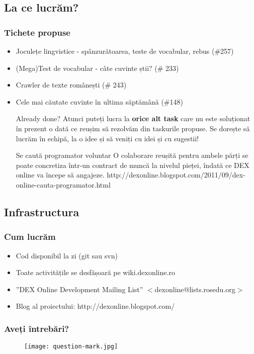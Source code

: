 \documentclass[red]{beamer}
\begin{document}
\subsection{La ce lucrăm?}
\begin{frame}

\frametitle{Tichete propuse}
\begin{itemize}
 \item Joculețe lingvistice - spânzurătoarea, teste de vocabular, rebus (\#257)
 \item (Mega)Test de vocabular - câte cuvinte știi? (\# 233)
   \item Crawler de texte românești (\# 243)
 \item Cele mai căutate cuvinte în ultima săptămână (\#148) \pause

 \begin{alertblock}{Already done?}
     Atunci puteți lucra la {\bf orice alt task} care nu este soluționat în prezent o dată ce reușim să rezolvăm din taskurile propuse. Se dorește să lucrăm
în echipă, la o idee și să veniți cu idei și cu sugestii!
 \end{alertblock} \pause
\begin{exampleblock}{Se caută programator voluntar}
O colaborare reușită pentru ambele părți se poate concretiza într-un contract de muncă la nivelul pieței, îndată ce DEX online va începe să angajeze.
http://dexonline.blogspot.com/2011/09/dex-online-cauta-programator.html
\end{exampleblock}


\end{itemize}
\end{frame}

\subsection{Infrastructura}
\begin{frame}
\frametitle{Cum lucrăm}
 \begin{itemize}
  \item Cod disponibil la zi (git sau svn)
  \item Toate activitățile se desfășoară pe wiki.dexonline.ro
  \item ”DEX Online Development Mailing List” $<$dexonline@lists.rosedu.org$>$
  \item Blog al proiectului: http://dexonline.blogspot.com/
 \end{itemize}

\end{frame}


\begin{frame}[plain]
\frametitle{Aveți întrebări?}
\begin{figure}
\texttt{[image: question-mark.jpg]} 
\end{figure}
\end{frame}
\end{document}
